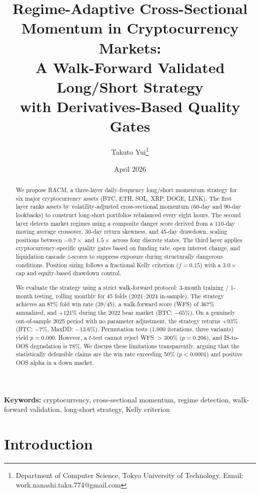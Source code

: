 \documentclass[12pt,a4paper]{article}
\title{Regime-Adaptive Cross-Sectional Momentum in Cryptocurrency Markets:\\
A Walk-Forward Validated Long/Short Strategy\\with Derivatives-Based Quality Gates}
\author{Takuto Yui\footnote{Department of Computer Science, Tokyo University of Technology. Email: work.nanashi.taku.774@gmail.com}}
\date{April 2026}
\begin{document}
\maketitle

\begin{abstract}
We propose RACM, a three-layer daily-frequency long/short momentum strategy for six major cryptocurrency assets (BTC, ETH, SOL, XRP, DOGE, LINK). The first layer ranks assets by volatility-adjusted cross-sectional momentum (60-day and 90-day lookbacks) to construct long-short portfolios rebalanced every eight hours. The second layer detects market regimes using a composite danger score derived from a 110-day moving average crossover, 30-day return skewness, and 45-day drawdown, scaling positions between $-0.7\times$ and $1.5\times$ across four discrete states. The third layer applies cryptocurrency-specific quality gates based on funding rate, open interest change, and liquidation cascade $z$-scores to suppress exposure during structurally dangerous conditions. Position sizing follows a fractional Kelly criterion ($f=0.15$) with a $3.0\times$ cap and equity-based drawdown control.

We evaluate the strategy using a strict walk-forward protocol: 3-month training / 1-month testing, rolling monthly for 45 folds (2021--2024 in-sample). The strategy achieves an 87\% fold win rate (39/45), a walk-forward score (WFS) of 367\% annualized, and $+121\%$ during the 2022 bear market (BTC: $-65\%$). On a genuinely out-of-sample 2025 period with no parameter adjustment, the strategy returns $+93\%$ (BTC: $-7\%$, MaxDD: $-13.6\%$). Permutation tests (1,000 iterations, three variants) yield $p=0.000$. However, a $t$-test cannot reject WFS $> 300\%$ ($p=0.206$), and IS-to-OOS degradation is 78\%. We discuss these limitations transparently, arguing that the statistically defensible claims are the win rate exceeding 50\% ($p<0.0001$) and positive OOS alpha in a down market.
\end{abstract}

\textbf{Keywords:} cryptocurrency, cross-sectional momentum, regime detection, walk-forward validation, long-short strategy, Kelly criterion

\section{Introduction}
\label{sec:intro}
\end{document}
